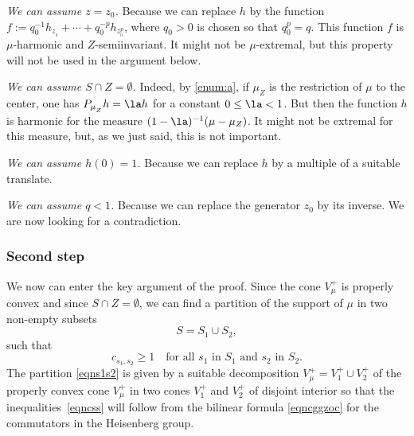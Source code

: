 \begin{enumeratea}
\item\label{enum:a}
\emph{We can assume $z=z_0$.}
Because we can replace $h$ by
the function $f:= q_0^{-1}h_{z_{_0}} +\cdots + q_0^{-p}h_{z_{_0}^{p}}$,
where $q_0>0$ is chosen so that $q_0^p=q$. This function $f$ is
$\mu$-harmonic and $Z$-semiinvariant. It might not be $\mu$-extremal,
but this property will not be used in the argument below.

\item
\emph{We can assume $S\cap Z=\emptyset$.} Indeed, by \eqref{enum:a}, if $\mu_Z$ is the restriction of
$\mu$ to the center, one has $P_{\mu_{_Z}}h=\la h$ for a constant $0\leq \la <1$.
But then the function $h$ is harmonic for the measure $(1-\la)^{-1}(\mu-\mu_Z)$.
It might not be extremal for this measure,
but, as we just said, this is not important.

\item
\emph{We can assume $h(0)= 1$.}
Because we can replace $h$ by a multiple of a suitable translate.

\item
\emph{We can assume $q< 1$.} Because we can replace the generator $z_0$
by its inverse. We are now looking for a contradiction.
\end{enumeratea}

\subsubsection*{Second step}
We now can enter the key argument of the proof.
Since the cone $V_\mu^+$ is properly convex and since $S\cap Z=\emptyset$,
we can find a partition of the support of $\mu$ in two non-empty subsets
\begin{equation}
\label{eqns1s2}
S=S_1\cup S_2,
\end{equation}
such that
\begin{equation}
\label{eqncss}
c_{s_1,s_2}\geq 1\quad
\text{for all $s_1$ in $S_1$ and $s_2$ in $S_2$.}
\end{equation}
The partition \eqref{eqns1s2} is given by a suitable decomposition
$V_\mu^+=V_1^+\cup V_2^+$ of the properly convex cone $V_\mu^+$
in two cones $V_1^+$ and $V_2^+$ of disjoint interior so that
the inequalities~\eqref{eqncss} will follow from the bilinear formula \eqref{eqncggzoc}
for the commutators in the Heisenberg group.

